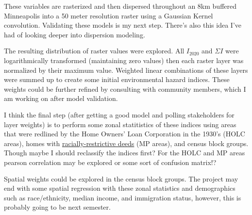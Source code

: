 \documentclass[article,12pt]{article}
\numberwithin{equation}{section}
\begin{document}
These variables are rasterized and then dispersed throughout an 8km buffered Minneapolis into a 50 meter resolution raster using a Gaussian Kernel convolution. Validating these models is my next step. There's also this idea I've had of looking deeper into dispersion modeling.

The resulting distribution of raster values were explored. All $I_{2020}$ and $\Sigma I$ were logarithmically transformed (maintaining zero values) then each raster layer was normalized by their maximum value. Weighted linear combinations of these layers were summed up to create some initial environmental hazard indices. These weights could be further refined by consulting with community members, which I am working on after model validation.

I think the final step (after getting a good model and polling stakeholders for layer weights) is to perform some zonal statitistics of these indices using areas that were redlined by the Home Owners’ Loan Corporation in the 1930’s (HOLC areas), homes with \href{https://pressbooks.umn.edu/mappingprejudicecurriculum/chapter/what-is-a-racial-covenant/}{racially-restrictive deeds} (MP areas), and census block groups. Though maybe I should reclassify the indices first? For the HOLC and MP areas pearson correlation may be explored or some sort of confusion matrix!?

Spatial weights could be explored in the census block groups. The project may end with some spatial regression with these zonal statistics and demographics such as race/ethnicity, median income, and immigration status, however, this is probably going to be next semester. 

\end{document}
